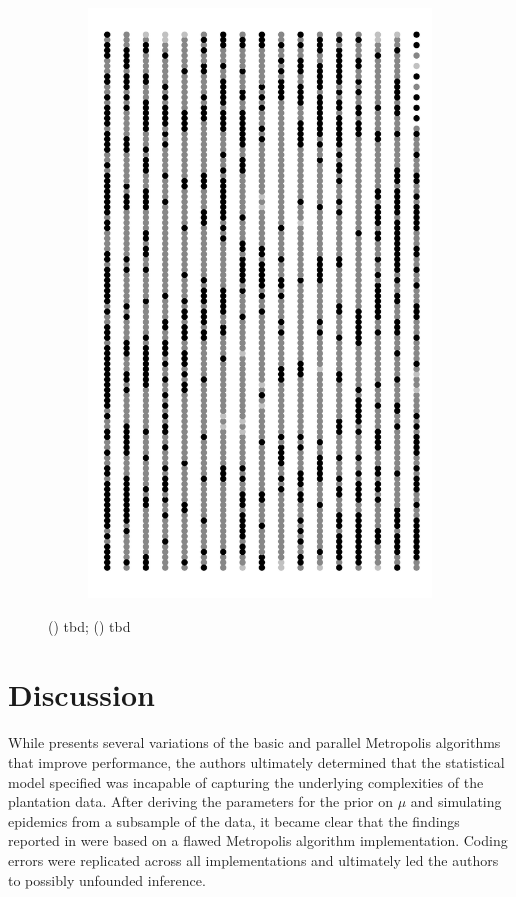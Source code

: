 \documentclass{uwstat572}
\begin{document}
\begin{figure}[H]
\begin{subfigure}[b]{0.24\textwidth}
		\includegraphics[width=\textwidth]{figures/figure_5d.png}
		\caption{}
		\label{fig:week_60}
	\end{subfigure}
	\caption{() tbd; () tbd }
	\label{fig:prediction}
\end{figure} 

\section{Discussion}
While \citet{Brown} presents several variations of the basic and parallel Metropolis algorithms that improve performance, the authors ultimately determined that the statistical model specified was incapable of capturing the underlying complexities of the plantation data. 
After deriving the parameters for the prior on $\mu$ and simulating epidemics from a subsample of the data, it became clear that the findings reported in \citet{Brown} were based on a flawed Metropolis algorithm implementation. 
Coding errors were replicated across all implementations and ultimately led the authors to possibly unfounded inference. 
\end{document}
